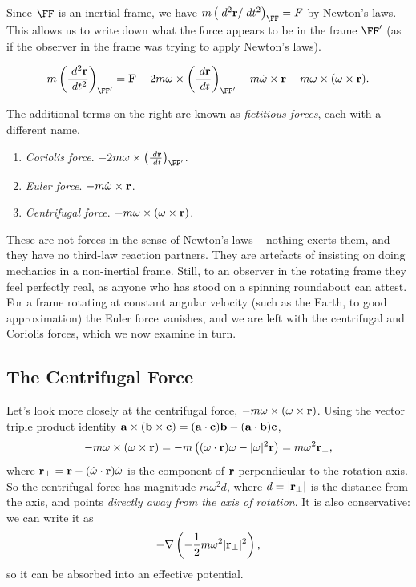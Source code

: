 \documentclass[a4paper]{scrartcl}
\newcommand{\hh}[1]{\hat{\vv{#1}}}
\begin{document}
Since $\FF$ is an inertial frame, we have $m\left(\dd^2 \vv r/ \dd t^2\right)_{\FF} = F$ by Newton's laws. This allows us to write down what the force appears to be in the frame $\FF'$ (as if the observer in the frame was trying to apply Newton's laws).

$$
m \left(\frac{\dd^2 \vv r}{\dd t^2}\right)_{\FF'} = \vv F - 2m \vv \omega \times \left(\frac{\dd \vv r}{\dd t}\right)_{\FF'} - m\dot{\vv \omega} \times \vv r - m\vv \omega \times (\vv \omega \times \vv r).
$$

The additional terms on the right are known as \emph{fictitious forces}, each with a different name.

\begin{enumerate}
	\item \emph{Coriolis force}. $- 2m \vv \omega \times \left(\frac{\dd \vv r}{\dd t}\right)_{\FF'}$.
	\item \emph{Euler force}. $- m\dot{\mathbf{\omega}} \times \mathbf{r}$.
	\item \emph{Centrifugal force}. $- m\mathbf{\omega} \times (\mathbf{\omega} \times \mathbf{r})$.
\end{enumerate}

These are not forces in the sense of Newton's laws -- nothing exerts them, and they have no third-law reaction partners. They are artefacts of insisting on doing mechanics in a non-inertial frame. Still, to an observer in the rotating frame they feel perfectly real, as anyone who has stood on a spinning roundabout can attest. For a frame rotating at constant angular velocity (such as the Earth, to good approximation) the Euler force vanishes, and we are left with the centrifugal and Coriolis forces, which we now examine in turn.

\subsection{The Centrifugal Force}

Let's look more closely at the centrifugal force, $-m \mathbf{\omega} \times (\mathbf{\omega} \times \mathbf{r})$. Using the vector triple product identity $\mathbf{a} \times (\mathbf{b} \times \mathbf{c}) = (\mathbf{a} \cdot \mathbf{c})\mathbf{b} - (\mathbf{a} \cdot \mathbf{b}) \mathbf{c}$,
$$
-m \mathbf{\omega} \times (\mathbf{\omega} \times \mathbf{r}) = -m\left((\mathbf{\omega} \cdot \mathbf{r})\mathbf{\omega} - |\mathbf{\omega}|^2 \mathbf{r}\right) = m \omega^2 \mathbf{r}_\perp,
$$
where $\vv r_\perp = \vv r - (\hh \omega \cdot \vv r)\hh \omega$ is the component of $\mathbf{r}$ perpendicular to the rotation axis. So the centrifugal force has magnitude $m\omega^2 d$, where $d = |\mathbf{r}_\perp|$ is the distance from the axis, and points \emph{directly away from the axis of rotation}. It is also conservative: we can write it as
$$
-\nabla \left(-\frac{1}{2}m\omega^2 |\mathbf{r}_\perp|^2\right),
$$
so it can be absorbed into an effective potential.
\end{document}
